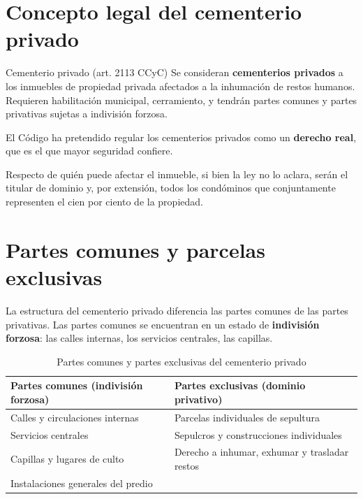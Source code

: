 \documentclass[12pt,oneside]{book}
\begin{document}

\section{Concepto legal del cementerio privado}

\begin{definition}{Cementerio privado (art. 2113 CCyC)}
Se consideran \textbf{cementerios privados} a los inmuebles de propiedad privada afectados a la inhumación de restos humanos. Requieren habilitación municipal, cerramiento, y tendrán partes comunes y partes privativas sujetas a indivisión forzosa.
\end{definition}

El Código ha pretendido regular los cementerios privados como un \textbf{derecho real}, que es el que mayor seguridad confiere.

Respecto de quién puede afectar el inmueble, si bien la ley no lo aclara, serán el titular de dominio y, por extensión, todos los condóminos que conjuntamente representen el cien por ciento de la propiedad.

\section{Partes comunes y parcelas exclusivas}

La estructura del cementerio privado diferencia las partes comunes de las partes privativas. Las partes comunes se encuentran en un estado de \textbf{indivisión forzosa}: las calles internas, los servicios centrales, las capillas.

\begin{table}[H]
\centering
\renewcommand{\arraystretch}{1.25}
\begin{tabularx}{\textwidth}{XX}
\toprule
\textbf{Partes comunes (indivisión forzosa)} & \textbf{Partes exclusivas (dominio privativo)} \\
\midrule
Calles y circulaciones internas & Parcelas individuales de sepultura \\
Servicios centrales & Sepulcros y construcciones individuales \\
Capillas y lugares de culto & Derecho a inhumar, exhumar y trasladar restos \\
Instalaciones generales del predio & \\
\bottomrule
\end{tabularx}
\caption{Partes comunes y partes exclusivas del cementerio privado}
\end{table}
\end{document}
